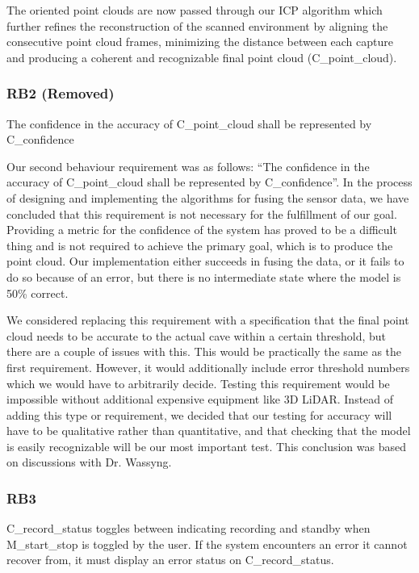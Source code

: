 \documentclass[11pt]{article}
\begin{document}
	The oriented point clouds are now passed through our ICP algorithm which further refines the reconstruction of the scanned environment by aligning the consecutive point cloud frames, minimizing the distance between each capture and producing a coherent and recognizable final point cloud (C\_point\_cloud).
	
	\subsubsection{RB2 (Removed)}
	 
	\begin{exampleblock}[red]
		The confidence in the accuracy of C\_point\_cloud shall be represented by C\_confidence
	\end{exampleblock}
	
	Our second behaviour requirement was as follows: “The confidence in the accuracy of C\_point\_cloud shall be represented by C\_confidence”. In the process of designing and implementing the algorithms for fusing the sensor data, we have concluded that this requirement is not necessary for the fulfillment of our goal. Providing a metric for the confidence of the system has proved to be a difficult thing and is not required to achieve the primary goal, which is to produce the point cloud. Our implementation either succeeds in fusing the data, or it fails to do so because of an error, but there is no intermediate state where the model is 50\% correct. 
	
	We considered replacing this requirement with a specification that the final point cloud needs to be accurate to the actual cave within a certain threshold, but there are a couple of issues with this. This would be practically the same as the first requirement. However, it would additionally include  error threshold numbers which we would have to arbitrarily decide. Testing this requirement would be impossible without additional expensive equipment like 3D LiDAR. Instead of adding this type or requirement, we decided that our testing for accuracy will have to be qualitative rather than quantitative, and that checking that the model is easily recognizable will be our most important test. This conclusion was based on discussions with Dr. Wassyng. 
	
	\subsubsection{RB3} 
	
	\begin{exampleblock}
		C\_record\_status toggles between indicating recording and standby when M\_start\_stop is toggled by the user. If the system encounters an error it cannot recover from, it must display an error status on C\_record\_status.
	\end{exampleblock}
	
\end{document}
